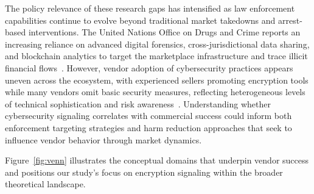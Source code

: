 \documentclass{article}
\begin{document}
The policy relevance of these research gaps has intensified as law enforcement capabilities continue to evolve beyond traditional market takedowns and arrest-based interventions. The United Nations Office on Drugs and Crime reports an increasing reliance on advanced digital forensics, cross-jurisdictional data sharing, and blockchain analytics to target the marketplace infrastructure and trace illicit financial flows~\cite{unodc2020}. However, vendor adoption of cybersecurity practices appears uneven across the ecosystem, with experienced sellers promoting encryption tools while many vendors omit basic security measures, reflecting heterogeneous levels of technical sophistication and risk awareness~\cite{dwyer2022}. Understanding whether cybersecurity signaling correlates with commercial success could inform both enforcement targeting strategies and harm reduction approaches that seek to influence vendor behavior through market dynamics.

Figure~\ref{fig:venn} illustrates the conceptual domains that underpin vendor success and positions our study's focus on encryption signaling within the broader theoretical landscape.
\end{document}
